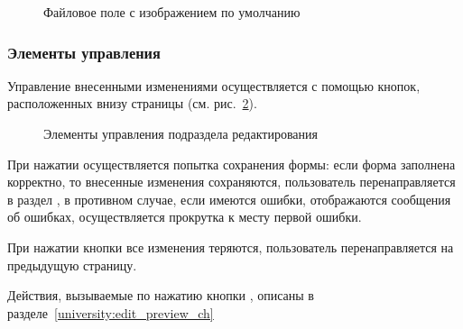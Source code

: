 \begin{itemize}
		\begin{figure}[H]
		\caption{Файловое поле с изображением по умолчанию}
		\label{university:edit_icon_image}
		\end{figure}
\end{itemize}

	\subsubsection{Элементы управления}\label{university:edit_save_cancel}
Управление внесенными изменениями осуществляется с помощью кнопок, расположенных внизу страницы (см. рис.~\ref{university:edit_buttons}).
		\begin{figure}[H]
		\caption{Элементы управления подраздела редактирования}
		\label{university:edit_buttons}
		\end{figure}	
		
При нажатии  осуществляется попытка сохранения формы: если форма заполнена корректно, то внесенные изменения сохраняются, пользователь перенаправляется в раздел , в противном случае, если имеются ошибки, отображаются сообщения об ошибках, осуществляется прокрутка к месту первой ошибки. 


При нажатии кнопки  все изменения теряются, пользователь перенаправляется на предыдущую страницу.


Действия, вызываемые по нажатию кнопки , описаны в разделе~\ref{university:edit_preview_ch}
	
